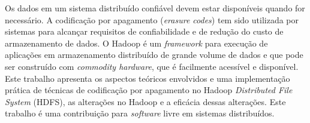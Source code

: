   Os dados em um sistema distribuído confiável devem estar disponíveis
  quando for necessário. A codificação por apagamento (\emph{erasure
    codes}) tem sido utilizada por sistemas para alcançar requisitos
  de confiabilidade e de redução do custo de armazenamento de dados. O
  Hadoop é um \emph{framework} para execução de aplicações em
  armazenamento distribuído de grande volume de dados e que pode ser
  construído com \emph{commodity hardware}, que é facilmente acessível
  e disponível. Este trabalho apresenta os aspectos teóricos envolvidos
  e uma implementação prática de técnicas de codificação por apagamento
  no Hadoop \emph{Distributed File System} (HDFS), as alterações no
  Hadoop e a eficácia dessas alterações. Este trabalho é uma
  contribuição para \emph{software} livre em sistemas distribuídos.

